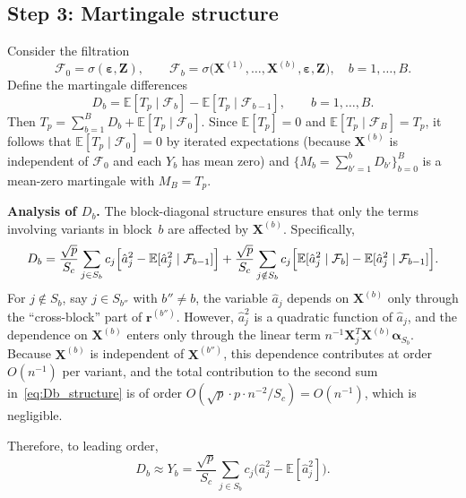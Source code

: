 \documentclass[11pt]{article}
\newcommand{\E}{\mathbb{E}}
\newcommand{\X}{\bm{X}}
\newcommand{\Z}{\bm{Z}}
\newcommand{\bal}{\bm{\alpha}}
\newcommand{\beps}{\bm{\varepsilon}}
\newcommand{\br}{\bm{r}}
\begin{document}
\subsection*{Step 3: Martingale structure}

Consider the filtration
\begin{equation}\label{eq:filtration}
  \mathcal{F}_0=\sigma(\beps,\Z),
  \qquad
  \mathcal{F}_b=\sigma\bigl(\X^{(1)},\dots,\X^{(b)},\beps,\Z\bigr),
  \quad b=1,\dots,B.
\end{equation}
Define the martingale differences
\begin{equation}\label{eq:Db}
  D_b = \E[T_p\mid\mathcal{F}_b]-\E[T_p\mid\mathcal{F}_{b-1}],
  \qquad b=1,\dots,B.
\end{equation}
Then $T_p=\sum_{b=1}^{B}D_b+\E[T_p\mid\mathcal{F}_0]$.  Since
$\E[T_p]=0$ and $\E[T_p\mid\mathcal{F}_B]=T_p$, it follows that
$\E[T_p\mid\mathcal{F}_0]=0$ by iterated expectations (because $\X^{(b)}$ is
independent of $\mathcal{F}_0$ and each $Y_b$ has mean zero) and
$\{M_b=\sum_{b'=1}^{b}D_{b'}\}_{b=0}^{B}$ is a mean-zero martingale
with $M_B=T_p$.

\medskip
\noindent\textbf{Analysis of $D_b$.}\;
The block-diagonal structure ensures that only the terms involving variants
in block~$b$ are affected by $\X^{(b)}$.  Specifically,
\begin{equation}\label{eq:Db_structure}
  D_b
  = \frac{\sqrt{p}}{S_c}\sum_{j\in S_b}c_j
    \Bigl[\hat{a}_j^{2}-\E[\hat{a}_j^{2}\mid\mathcal{F}_{b-1}]\Bigr]
  + \frac{\sqrt{p}}{S_c}\sum_{\substack{j\notin S_b}}c_j
    \Bigl[\E[\hat{a}_j^{2}\mid\mathcal{F}_b]
    -\E[\hat{a}_j^{2}\mid\mathcal{F}_{b-1}]\Bigr].
\end{equation}
For $j\notin S_b$, say $j\in S_{b''}$ with $b''\ne b$, the variable
$\hat{a}_j$ depends on $\X^{(b)}$ only through the ``cross-block'' part of
$\br^{(b'')}$.  However, $\hat{a}_j^{2}$ is a quadratic function
of $\hat{a}_j$, and the dependence on $\X^{(b)}$ enters only through the
linear term $n^{-1}\X_j^{T}\X^{(b)}\bal_{S_b}$.  Because $\X^{(b)}$ is
independent of $\X^{(b'')}$, this dependence contributes at
order~$O(n^{-1})$ per variant, and the total contribution to the second sum
in~\eqref{eq:Db_structure} is of order $O(\sqrt{p}\cdot p\cdot n^{-2}/S_c)
=O(n^{-1})$, which is negligible.

Therefore, to leading order,
\begin{equation}\label{eq:Db_approx}
  D_b \approx Y_b
  = \frac{\sqrt{p}}{S_c}\sum_{j\in S_b}c_j
    \bigl(\hat{a}_j^{2}-\E[\hat{a}_j^{2}]\bigr).
\end{equation}
\end{document}
